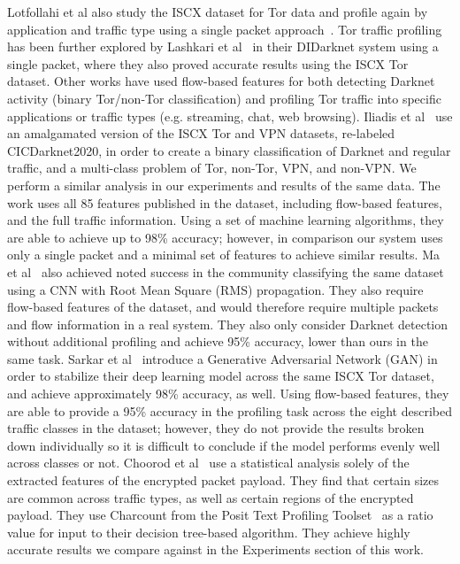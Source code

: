 Lotfollahi et al also study the ISCX dataset for Tor data and profile again by application and traffic type using a single packet approach~\cite{deeppacket}. Tor traffic profiling has been further explored by Lashkari et al~\cite{didarknet} in their DIDarknet system using a single packet, where they also proved accurate results using the ISCX Tor dataset. Other works have used flow-based features for both detecting Darknet activity (binary Tor/non-Tor classification) and profiling Tor traffic into specific applications or traffic types (e.g. streaming, chat, web browsing). Iliadis et al~\cite{iliadis2021darknet} use an amalgamated version of the ISCX Tor and VPN datasets, re-labeled CICDarknet2020, in order to create a binary classification of Darknet and regular traffic, and a multi-class problem of Tor, non-Tor, VPN, and non-VPN. We perform a similar analysis in our experiments and results of the same data. The work uses all 85 features published in the dataset, including flow-based features, and the full traffic information. Using a set of machine learning algorithms, they are able to achieve up to 98\% accuracy; however, in comparison our system uses only a single packet and a minimal set of features to achieve similar results. Ma et al~\cite{Ma2021dark} also achieved noted success in the community classifying the same dataset using a CNN with Root Mean Square (RMS) propagation. They also require flow-based features of the dataset, and would therefore require multiple packets and flow information in a real system. They also only consider Darknet detection without additional profiling and achieve 95\% accuracy, lower than ours in the same task. Sarkar et al~\cite{sarkar2020detection} introduce a Generative Adversarial Network (GAN) in order to stabilize their deep learning model across the same ISCX Tor dataset, and achieve approximately 98\% accuracy, as well. Using flow-based features, they are able to provide a 95\% accuracy in the profiling task across the eight described traffic classes in the dataset; however, they do not provide the results broken down individually so it is difficult to conclude if the model performs evenly well across classes or not. Choorod et al~\cite{choorod2022tor} use a statistical analysis solely of the extracted features of the encrypted packet payload. They find that certain sizes are common across traffic types, as well as certain regions of the encrypted payload. They use Charcount from the Posit Text Profiling Toolset~\cite{Weir2007ThePT} as a ratio value for input to their decision tree-based algorithm. They achieve highly accurate results we compare against in the Experiments section of this work.

